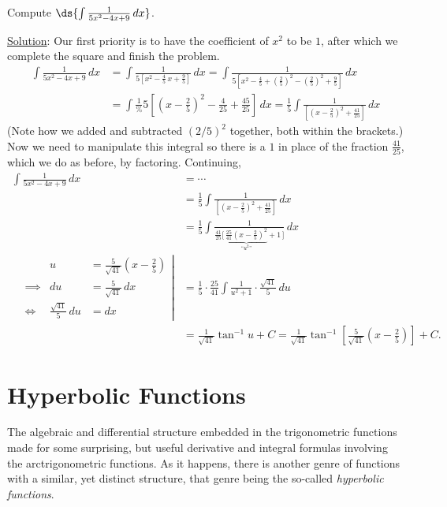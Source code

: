 \bex Compute $\ds{\int\frac1{5x^2-4x+9}\,dx}$.

\underline{Solution}: Our first priority is to have the 
coefficient of $x^2$ to be $1$, after which we complete the
square and finish the problem.
\begin{align*}\int\frac1{5x^2-4x+9}\,dx
&=\int\frac1{5\left[x^2-\frac45\,x+\frac95\right]}\,dx
=\int\frac1{5\left[x^2-\frac45+\left(\frac25\right)^2-\left(\frac25\right)^2
              +\frac95\right]}\,dx\\
&=\int\frac1%
{5\left[\left(x-\frac25\right)^2-\frac4{25}+\frac{45}{25}\right]}\,dx
=\frac15\int\frac1{\left[\left(x-\frac25\right)^2+\frac{41}{25}\right]}\,dx
\end{align*}
(Note how we added and subtracted $(2/5)^2$ together, both within the 
brackets.)
Now we need to manipulate this integral so there is a $1$ 
in place of the fraction $\frac{41}{25}$, which we do as before,
by factoring. Continuing,
\begin{align*}
\int\frac1{5x^2-4x+9}\,dx&=\cdots\\
&=\frac15\int\frac1{\left[\left(x-\frac25\right)^2+\frac{41}{25}\right]}\,dx\\
&=\frac15\int\frac1{\frac{41}{25}\biggl[\,
 \underbrace{\frac{25}{41}\left(x-\frac25\right)^2}_{\text{``$u^2$''}}
 +1\,\biggr]}\,dx\\
\left.\begin{alignedat}{2}
&&u&=\frac5{\sqrt{41}}\left(x-\frac25\right)\\
&\implies&du&=\frac5{\sqrt{41}}\,dx\\
&\iff&\frac{\sqrt{41}}5\,du&=dx\end{alignedat}\right|
&=\frac15\cdot\frac{25}{41}\int\frac1{u^2+1}\cdot\frac{\sqrt{41}}5\,du\\
&=\frac1{\sqrt{41}}\tan^{-1}u+C
 =\frac1{\sqrt{41}}\tan^{-1}\left[
           \frac5{\sqrt{41}}\left(x-\frac25\right)\right]+C.
\end{align*}

\eex



\newpage
\section{Hyperbolic Functions}
The algebraic and differential structure embedded in the trigonometric
functions made for some surprising, but useful derivative and integral
formulas involving the arctrigonometric functions.  As it happens,
there is another genre of functions with a similar, yet distinct
structure, that genre being the so-called {\it hyperbolic functions}.


